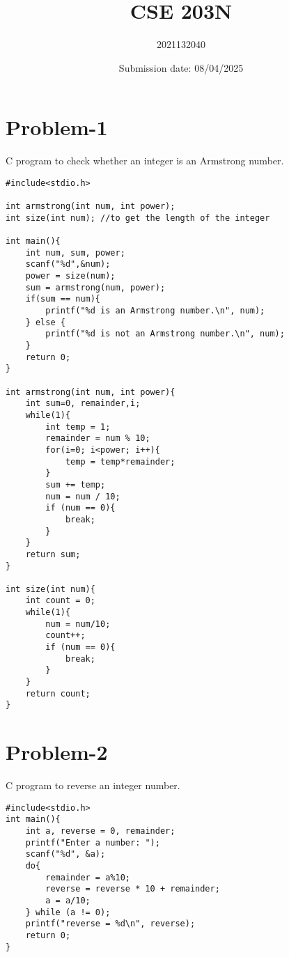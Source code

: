 \documentclass{article}
\title{CSE 203N}
\author{2021132040}
\date{Submission date: 08/04/2025}
\begin{document}
\maketitle


\section*{Problem-1} C program to check whether an integer is an Armstrong number.
\begin{lstlisting}
#include<stdio.h>

int armstrong(int num, int power);
int size(int num); //to get the length of the integer

int main(){
    int num, sum, power;
    scanf("%d",&num);
    power = size(num);
    sum = armstrong(num, power);
    if(sum == num){
        printf("%d is an Armstrong number.\n", num);
    } else {
        printf("%d is not an Armstrong number.\n", num);
    }
    return 0;
}

int armstrong(int num, int power){
    int sum=0, remainder,i;
    while(1){
        int temp = 1;
        remainder = num % 10;
        for(i=0; i<power; i++){
            temp = temp*remainder;
        }
        sum += temp;
        num = num / 10;
        if (num == 0){
            break;
        }
    }
    return sum;
}

int size(int num){
    int count = 0;
    while(1){
        num = num/10;
        count++;
        if (num == 0){
            break;
        }
    }
    return count;
}
\end{lstlisting}

\section*{Problem-2} C program to reverse an integer number.
\begin{lstlisting}
#include<stdio.h>
int main(){
    int a, reverse = 0, remainder;
    printf("Enter a number: ");
    scanf("%d", &a);
    do{
        remainder = a%10;
        reverse = reverse * 10 + remainder;
        a = a/10;
    } while (a != 0);
    printf("reverse = %d\n", reverse);
    return 0;
}
\end{lstlisting}
\end{document}
